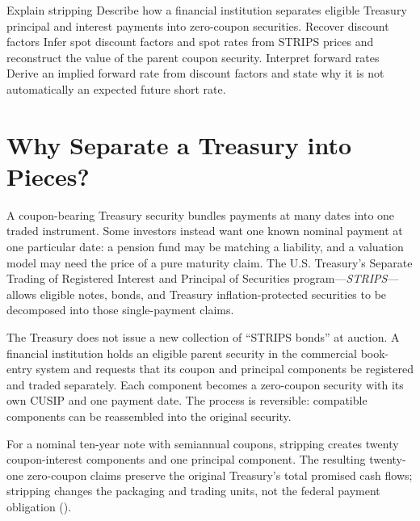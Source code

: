 \documentclass[11pt]{article}
\begin{document}

\learningobjectives
  {Explain stripping}
  {Describe how a financial institution separates eligible Treasury principal and interest payments into zero-coupon securities.}
  {Recover discount factors}
  {Infer spot discount factors and spot rates from STRIPS prices and reconstruct the value of the parent coupon security.}
  {Interpret forward rates}
  {Derive an implied forward rate from discount factors and state why it is not automatically an expected future short rate.}

\section{Why Separate a Treasury into Pieces?}

A coupon-bearing Treasury security bundles payments at many dates into one traded instrument. Some investors instead want one known nominal payment at one particular date: a pension fund may be matching a liability, and a valuation model may need the price of a pure maturity claim. The U.S. Treasury's Separate Trading of Registered Interest and Principal of Securities program---\emph{STRIPS}---allows eligible notes, bonds, and Treasury inflation-protected securities to be decomposed into those single-payment claims.

The Treasury does not issue a new collection of ``STRIPS bonds'' at auction. A financial institution holds an eligible parent security in the commercial book-entry system and requests that its coupon and principal components be registered and traded separately. Each component becomes a zero-coupon security with its own CUSIP and one payment date. The process is reversible: compatible components can be reassembled into the original security.

For a nominal ten-year note with semiannual coupons, stripping creates twenty coupon-interest components and one principal component. The resulting twenty-one zero-coupon claims preserve the original Treasury's total promised cash flows; stripping changes the packaging and trading units, not the federal payment obligation ().
\end{document}
